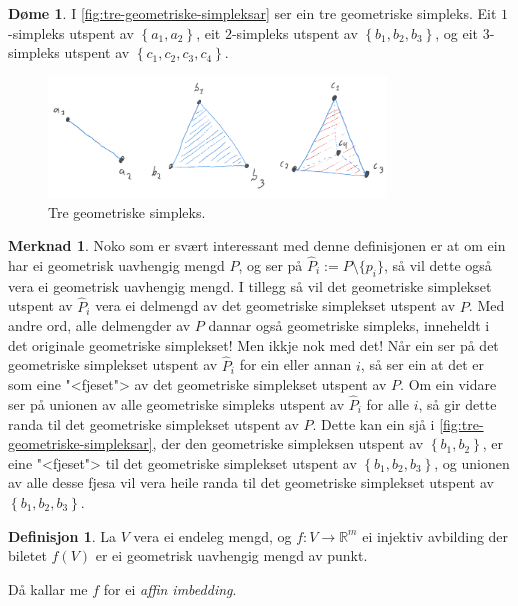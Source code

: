 \documentclass[a4paper, 12pt, norsk]{article}
\theoremstyle{plain}
\theoremstyle{definition}
\newtheorem{definition}[theorem]{Definisjon}
\newtheorem{example}[theorem]{Døme}
\newtheorem{remark}[theorem]{Merknad}
\newcommand{\Rb}{\mathbb{R}}
\newcommand{\set}[1]{ \left\{ #1 \right\} } %
\begin{document}
\begin{example}
	 I \autoref{fig:tre-geometriske-simpleksar} ser ein tre geometriske simpleks. Eit \( 1 \)-simpleks utspent av \( \set{a_1, a_2} \), eit \(2\)-simpleks utspent av \( \set{b_1, b_2, b_3} \), og eit \(3\)-simpleks utspent av \( \set{c_1, c_2, c_3, c_4} \).
	\begin{figure}[htbp]
		\begin{center}
			\includegraphics[width=0.8\textwidth]{png/Eksempel1-8.png}
			\caption{Tre geometriske simpleks.}
			\label{fig:tre-geometriske-simpleksar}
		\end{center}
	\end{figure}
\end{example}

\begin{remark}
	Noko som er svært interessant med denne definisjonen er at om ein har ei geometrisk uavhengig mengd $P$, og ser på $\hat{P}_i := P \setminus \{p_i\}$, så vil dette også vera ei geometrisk uavhengig mengd. I tillegg så vil det geometriske simplekset utspent av $\hat{P}_i$ vera ei delmengd av det geometriske simplekset utspent av $P$. Med andre ord, alle delmengder av $P$ dannar også geometriske simpleks, inneheldt i det originale geometriske simplekset! Men ikkje nok med det! Når ein ser på det geometriske simplekset utspent av $\hat{P}_i$ for ein eller annan $i$, så ser ein at det er som eine "<fjeset"> av det geometriske simplekset utspent av $P$. Om ein vidare ser på unionen av alle geometriske simpleks utspent av \( \hat{P}_i \) for alle \( i \), så gir dette randa til det geometriske simplekset utspent av \( P \). Dette kan ein sjå i \autoref{fig:tre-geometriske-simpleksar}, der den geometriske simpleksen utspent av \( \set{b_1, b_2} \), er eine "<fjeset"> til det geometriske simplekset utspent av \( \set{b_1, b_2, b_3} \), og unionen av alle desse fjesa vil vera heile randa til det geometriske simplekset utspent av \( \set{b_1, b_2, b_3} \).
\end{remark}

\begin{definition}
	La $V$ vera ei endeleg mengd, og $f:V\rightarrow \Rb^m$ ei injektiv avbilding der biletet $f(V)$ er ei geometrisk uavhengig mengd av punkt. 
	
	Då kallar me \( f \) for ei \emph{affin imbedding}.
\end{definition}
\end{document}
